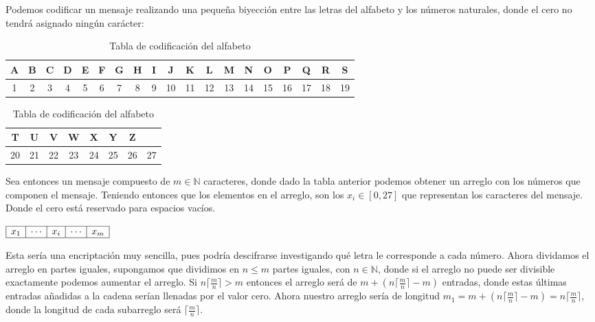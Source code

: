 \documentclass[10pt,a4paper]{article}
\begin{document}
Podemos codificar un mensaje realizando una pequeña biyección entre las letras del alfabeto y los números naturales, donde el cero no tendrá asignado ningún carácter:

\vspace{10pt}

\begin{table}[h]
    \centering
    \renewcommand{\arraystretch}{1.2}
    \setlength{\tabcolsep}{4pt}
    \begin{tabular}{|*{19}{c|}}
        \hline 
        A & B & C & D & E & F & G & H & I & J & K & L & M & N & O & P & Q & R & S \\
        \hline 
        1 & 2 & 3 & 4 & 5 & 6 & 7 & 8 & 9 & 10 & 11 & 12 & 13 & 14 & 15 & 16 & 17 & 18 & 19 \\
        \hline 
    \end{tabular}

    \vspace{5pt}

    \begin{tabular}{|*{8}{c|}}
        \hline
        T & U & V & W & X & Y & Z & \text{--} \\ 
        \hline
        20 & 21 & 22 & 23 & 24 & 25 & 26 & 27 \\ 
        \hline 
    \end{tabular}
    \caption{Tabla de codificación del alfabeto}
    \label{tab:codificacion}
\end{table}

\vspace{10pt}

Sea entonces un mensaje compuesto de $m \in \mathbb{N}$ caracteres, donde dado la tabla anterior podemos obtener un arreglo con los números que componen el mensaje.
Teniendo entonces que los elementos en el arreglo, son los $x_{i} \in [0,27]$ que representan los caracteres del mensaje. Donde el cero está reservado para espacios vacíos.

\vspace{10pt}

$\begin{array}{|c|c|c|c|c|}
\hline
x_{1} & \cdots & x_{i} & \cdots & x_{m}\\
\hline
\end{array}$ 

\vspace{10pt}

Esta sería una encriptación muy sencilla, pues podría descifrarse investigando qué letra le corresponde a cada número. 
Ahora dividamos el arreglo en partes iguales, supongamos que dividimos en $n \leq m$ partes iguales, con $n \in \mathbb{N}$, donde si el arreglo no puede ser divisible exactamente podemos aumentar el arreglo. Si $n \lceil\frac{m}{n}\rceil > m$ entonces el arreglo será de $m+ ( n \lceil\frac{m}{n}\rceil -m)$ entradas, donde estas últimas entradas añadidas a la cadena serían llenadas por el valor cero.
Ahora nuestro arreglo sería de longitud $m_{1}=m+ ( n \lceil\frac{m}{n}\rceil -m)=n \lceil\frac{m}{n}\rceil$, donde la longitud de cada subarreglo será $\lceil\frac{m}{n}\rceil$.
\end{document}
